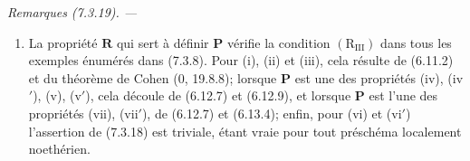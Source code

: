 \documentclass[10pt,oneside]{book}
\makeatletter
\newcommand{\oldpage}[2][]{%
  \setcounter{footnote}{0}%
  \marginpar{\scriptsize\textbf{#1}~|~#2}\ignorespaces}
\newenvironment{remarks}[1][]{%
  \par\medskip\noindent\itshape Remarques (#1). ---\ }{\par}
\newcommand{\EGAReaderTarget}[2]{\hypertarget{#1}{}\@bsphack\begingroup\def\@currentHref{#1}\label{#2}\endgroup\@esphack}
\makeatother
\begin{document}
\begin{remarks}[7.3.19]
\EGAReaderTarget{ega4.c04.statement.7-3-19}{IV.2.s7.3.19-fr}
\begin{enumerate}
\item[\emph{i)}] La propriété $\boldsymbol R$ qui sert à définir $\boldsymbol P$
vérifie la condition $(\mathrm R_{\mathrm{III}})$ dans tous les exemples
énumérés dans (7.3.8). Pour (i), (ii) et (iii), cela résulte de (6.11.2)
et du théorème de Cohen (0, 19.8.8); lorsque $\boldsymbol P$ est une des
propriétés (iv), (iv$'$), (v), (v$'$), cela découle de (6.12.7) et
(6.12.9), et lorsque $\boldsymbol P$ est l'une des propriétés (vii),
(vii$'$), de (6.12.7) et (6.13.4); enfin, pour (vi) et (vi$'$)
l'assertion de (7.3.18) est triviale, étant vraie pour tout préschéma
localement noethérien.

\oldpage[IV-2]{198}


\end{enumerate}
\end{remarks}
\end{document}
